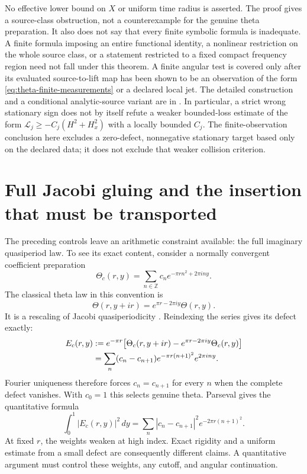 \documentclass[11pt]{article}
\numberwithin{equation}{section}
\theoremstyle{definition}
\theoremstyle{remark}
\begin{document}
No effective lower bound on $X$ or uniform time radius is asserted.
The proof gives a source-class obstruction, not a counterexample for
the genuine theta preparation.  It also does not say that every
finite symbolic formula is inadequate.  A finite formula imposing an
entire functional identity, a nonlinear restriction on the whole
source class, or a statement restricted to a fixed compact frequency
region need not fall under this theorem.  A finite angular test is
covered only after its evaluated source-to-lift map has been shown to
be an observation of the form
\eqref{eq:theta-finite-measurements} or a declared local jet.
The detailed construction and a conditional analytic-source variant
are in \cite{localobstruction}.
In particular, a strict wrong stationary sign does not by itself
refute a weaker bounded-loss estimate of the form
$\mathscr L_j\ge-C_j(H^2+H_x^2)$ with a locally bounded $C_j$.
The finite-observation conclusion here excludes a zero-defect,
nonnegative stationary target based only on the declared data; it
does not exclude that weaker collision criterion.

\section{Full Jacobi gluing and the insertion that must be transported}
\label{sec:theta-gluing}

The preceding controls leave an arithmetic constraint available: the
full imaginary quasiperiod law.  To see its exact content, consider a
normally convergent coefficient preparation
\[
 \Theta_c(r,y)=\sum_{n\in\mathbb Z}
                 c_ne^{-\pi rn^2+2\pi iny}.
\]
The classical theta law in this convention is
\begin{equation}
 \Theta(r,y+ir)=e^{\pi r-2\pi iy}\Theta(r,y).
 \label{eq:theta-imaginary-law}
\end{equation}
It is a rescaling of Jacobi quasiperiodicity \cite{dlmf}.
Reindexing the series gives its defect exactly:
\begin{align}
 E_c(r,y)
 &:=e^{-\pi r}\bigl[
      \Theta_c(r,y+ir)-e^{\pi r-2\pi iy}\Theta_c(r,y)\bigr]
 \notag\\
 &=\sum_n(c_n-c_{n+1})
                  e^{-\pi r(n+1)^2}e^{2\pi iny}.
 \label{eq:theta-coefficient-defect}
\end{align}
Fourier uniqueness therefore forces $c_n=c_{n+1}$ for every $n$ when
the complete defect vanishes.  With $c_0=1$ this selects genuine theta.
Parseval gives the quantitative formula
\begin{equation}
 \int_0^1|E_c(r,y)|^2\,dy
 =\sum_n|c_n-c_{n+1}|^2e^{-2\pi r(n+1)^2}.
 \label{eq:theta-weighted-gluing-norm}
\end{equation}
At fixed $r$, the weights weaken at high index.  Exact rigidity and a
uniform estimate from a small defect are consequently different
claims.  A quantitative argument must control these weights, any
cutoff, and angular continuation.
\end{document}

